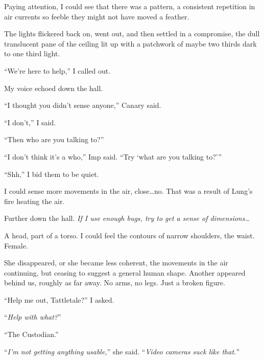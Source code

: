 Paying attention,  I could see that there was a pattern, a consistent repetition in air currents so feeble they might not have moved a feather.



The lights flickered back on, went out, and then settled in a compromise, the dull translucent pane of the ceiling lit up with a patchwork of  maybe two thirds dark to one third light.



``We're here to help,'' I called out.



My voice echoed down the hall.



``I thought you didn't sense anyone,'' Canary said.



``I don't,'' I said.



``Then who are you talking to?''



``I don't think it's a who,'' Imp said.  ``Try `what are you talking to?'''



``Shh,'' I bid them to be quiet.



I could sense more movements in the air, close\ldots no.  That was a result of Lung's fire heating the air.



Further down the hall.  \emph{If I use enough bugs, try to get a sense of dimensions\ldots}



A head, part of a torso.  I could feel the contours of narrow shoulders, the waist.  Female.



She disappeared, or she became less coherent, the movements in the air continuing, but ceasing to suggest a general human shape.  Another appeared behind us, roughly as far away.  No arms, no legs.  Just a broken figure.



``Help me out, Tattletale?'' I asked.



``\emph{Help with what?}''



``The Custodian.''



``\emph{I'm not getting anything usable,}'' she said.  ``\emph{Video cameras suck like that.}''



